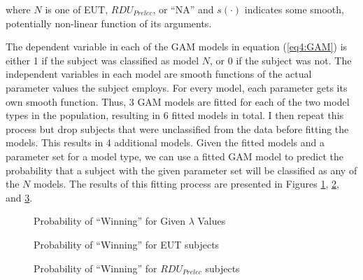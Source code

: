 \documentclass[../main.tex]{subfiles}
\begin{document}
\addtocounter{footnote}{-1}

\noindent where $N$ is one of EUT, $\mathit{RDU_{Prelec}}$, or \enquote{NA} and $s(\cdot)$ indicates some smooth, potentially non-linear function of its arguments.

The dependent variable in each of the GAM models in equation (\ref{eq4:GAM}) is either 1 if the subject was classified as model $N$, or 0 if the subject was not.
The independent variables in each model are smooth functions of the actual parameter values the subject employs.
For every model, each parameter gets its own smooth function.
Thus, 3 GAM models are fitted for each of the two model types in the population, resulting in 6 fitted models in total.
I then repeat this process but drop subjects that were unclassified from the data before fitting the models.
This results in 4 additional models.
Given the fitted models and a parameter set for a model type, we can use a fitted GAM model to predict the probability that a subject with the given parameter set will be classified as any of the $N$ models.
The results of this fitting process are presented in Figures \ref{fig:HN1_win_mu}, \ref{fig:HN1_win_eut}, and \ref{fig:HN1_win_pre}.

\begin{figure}[h!]
	\center
	\caption{Probability of \enquote{Winning} for Given $\lambda$ Values}
	\label{fig:HN1_win_mu}
\end{figure}

\begin{figure}[h!]
	\center
	\caption{Probability of \enquote{Winning} for EUT subjects}
	\label{fig:HN1_win_eut}
\end{figure}

\begin{figure}[h!]
	\center
	\caption{Probability of \enquote{Winning} for $\mathit{RDU_{Prelec}}$ subjects}
	\label{fig:HN1_win_pre}
\end{figure}
\end{document}
